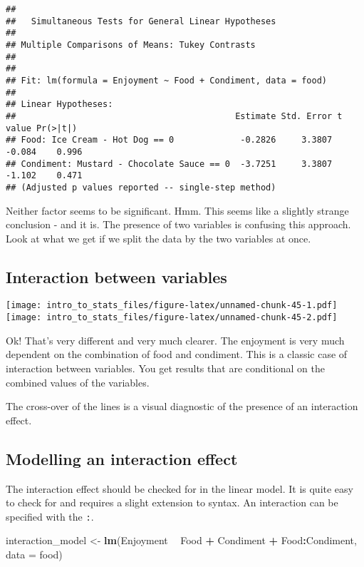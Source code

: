 \documentclass[]{book}
\newenvironment{Shaded}{\begin{snugshade}}{\end{snugshade}}
\newcommand{\DataTypeTok}[1]{\textcolor[rgb]{0.13,0.29,0.53}{#1}}
\newcommand{\KeywordTok}[1]{\textcolor[rgb]{0.13,0.29,0.53}{\textbf{#1}}}
\newcommand{\NormalTok}[1]{#1}
\newcommand{\OperatorTok}[1]{\textcolor[rgb]{0.81,0.36,0.00}{\textbf{#1}}}
\newcommand{\StringTok}[1]{\textcolor[rgb]{0.31,0.60,0.02}{#1}}
\begin{document}
\begin{verbatim}
## 
##   Simultaneous Tests for General Linear Hypotheses
## 
## Multiple Comparisons of Means: Tukey Contrasts
## 
## 
## Fit: lm(formula = Enjoyment ~ Food + Condiment, data = food)
## 
## Linear Hypotheses:
##                                           Estimate Std. Error t value Pr(>|t|)
## Food: Ice Cream - Hot Dog == 0             -0.2826     3.3807  -0.084    0.996
## Condiment: Mustard - Chocolate Sauce == 0  -3.7251     3.3807  -1.102    0.471
## (Adjusted p values reported -- single-step method)
\end{verbatim}

Neither factor seems to be significant. Hmm. This seems like a slightly strange conclusion - and it is. The presence of two variables is confusing this approach. Look at what we get if we split the data by the two variables at once.

\hypertarget{interaction-between-variables}{%
\subsection{Interaction between variables}\label{interaction-between-variables}}

\texttt{[image: intro\_to\_stats\_files/figure-latex/unnamed-chunk-45-1.pdf]} \texttt{[image: intro\_to\_stats\_files/figure-latex/unnamed-chunk-45-2.pdf]}

Ok! That's very different and very much clearer. The enjoyment is very much dependent on the combination of food and condiment. This is a classic case of interaction between variables. You get results that are conditional on the combined values of the variables.

The cross-over of the lines is a visual diagnostic of the presence of an interaction effect.

\hypertarget{modelling-an-interaction-effect}{%
\subsection{Modelling an interaction effect}\label{modelling-an-interaction-effect}}

The interaction effect should be checked for in the linear model. It is quite easy to check for and requires a slight extension to syntax. An interaction can be specified with the \texttt{:}.

\begin{Shaded}
\begin{Highlighting}[]
\NormalTok{interaction_model <-}\StringTok{ }\KeywordTok{lm}\NormalTok{(Enjoyment }\OperatorTok{~}\StringTok{ }\NormalTok{Food }\OperatorTok{+}\StringTok{ }\NormalTok{Condiment }\OperatorTok{+}\StringTok{ }\NormalTok{Food}\OperatorTok{:}\NormalTok{Condiment, }\DataTypeTok{data =}\NormalTok{ food)}
\end{Highlighting}
\end{Shaded}
\end{document}
